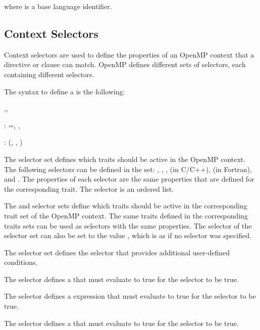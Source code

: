 where  is a base language identifier.

\subsection{Context Selectors}
\label{subsec:Context Selectors}

Context selectors are used to define the properties of an OpenMP context that
a directive or clause can match. OpenMP defines different sets of selectors, each containing different selectors.

The syntax to define a  is the following:

\begin{ompSyntax}
\plc{trait-set-selector[},\plc{trait-set-selector[},\plc{...]]}

:
   ={\plc{trait-selector[}, \plc{trait-selector[}, \plc{...]]}}

:
   \plc{trait-selector-name[}(\plc{trait-property[}, \plc{trait-property[}, \plc{...]]})\plc{]}
\end{ompSyntax}

The  selector set defines which  traits should
be active in the OpenMP context. The following selectors can be defined in the
 set: , , , 
(in C/C++),  (in Fortran), and . The properties of each
selector are the same properties that are defined for the corresponding trait.
The  selector is an ordered list.

The  and  selector sets define which traits
should be active in the corresponding trait set of the OpenMP context. The
same traits defined in the corresponding traits sets can be used as selectors
with the same properties. The  selector of the 
selector set can also be set to the value , which is as if no
 selector was specified.

The  selector set defines the  selector that provides additional user-defined conditions.
\begin{cspecific}
The \code{)} selector defines a  that must evaluate to true for the selector to be true.
\end{cspecific}
\begin{cppspecific}
The \code{)} selector defines a  expression that must evaluate to true for the selector to be true.
\end{cppspecific}
\begin{fortranspecific}
The \code{)} selector defines a  that must evaluate to true for the selector to be true.
\end{fortranspecific}

